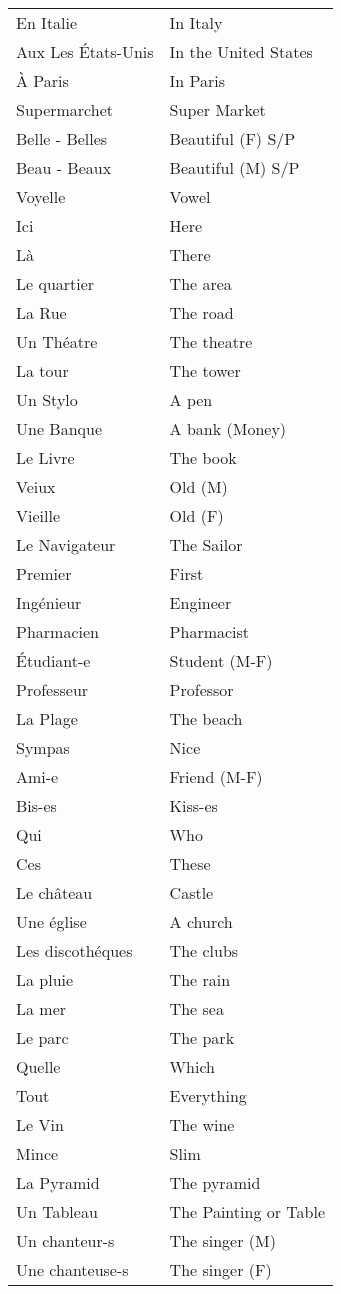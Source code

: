 \begin{longtable}{l  l}
En Italie	& In Italy	\\
Aux Les \'Etats-Unis & In the United States	\\
\`A Paris	& In Paris	\\
Supermarchet	& Super Market	\\
Belle - Belles  & Beautiful (F) S/P	\\
Beau - Beaux	& Beautiful (M) S/P	\\
Voyelle		& Vowel		\\
Ici		& Here		\\
L\`a		& There		\\
Le quartier	& The area	\\
La Rue		& The road	\\
Un Th\'eatre	& The theatre	\\
La tour		& The tower	\\
Un Stylo	& A pen		\\
Une Banque	& A bank (Money)\\
Le Livre	& The book	\\
Veiux		& Old (M)	\\
Vieille		& Old (F)	\\
Le Navigateur	& The Sailor	\\
Premier		& First		\\
Ing\'enieur	& Engineer	\\
Pharmacien	& Pharmacist	\\
\'Etudiant-e	& Student (M-F)	\\
Professeur	& Professor	\\
La Plage	& The beach	\\
Sympas		& Nice		\\
Ami-e		& Friend (M-F)	\\
Bis-es		& Kiss-es	\\
Qui		& Who		\\
Ces		& These		\\
Le ch\^ateau 	& Castle	\\
Une \'eglise	& A church	\\
Les discoth\'eques	& The clubs	\\
La pluie	& The rain	\\
La mer		& The sea	\\
Le parc		& The park	\\
Quelle		& Which		\\
Tout 		& Everything	\\
Le Vin		& The wine	\\
Mince		& Slim		\\
La Pyramid	& The pyramid	\\
Un Tableau	& The Painting or Table	\\
Un chanteur-s	& The singer (M)\\
Une chanteuse-s	& The singer (F)\\
\end{longtable}
